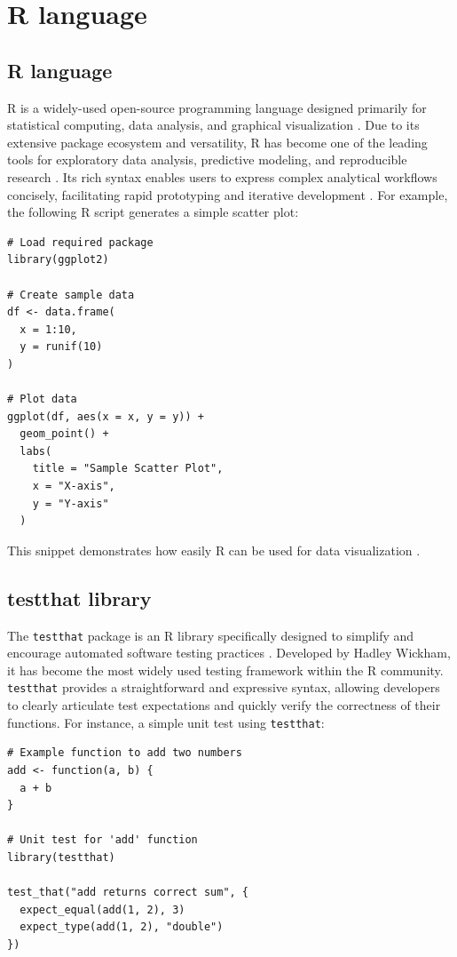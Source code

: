 \section{R language}

\subsection{R language}

R is a widely-used open-source programming language designed primarily for statistical computing, data analysis, and graphical visualization \cite{rcore2024}. Due to its extensive package ecosystem and versatility, R has become one of the leading tools for exploratory data analysis, predictive modeling, and reproducible research \cite{wickham2014advanced}. Its rich syntax enables users to express complex analytical workflows concisely, facilitating rapid prototyping and iterative development \cite{wickham2019r4ds}. For example, the following R script generates a simple scatter plot:

\begin{verbatim}
# Load required package
library(ggplot2)

# Create sample data
df <- data.frame(
  x = 1:10,
  y = runif(10)
)

# Plot data
ggplot(df, aes(x = x, y = y)) +
  geom_point() +
  labs(
    title = "Sample Scatter Plot",
    x = "X-axis",
    y = "Y-axis"
  )
\end{verbatim}

This snippet demonstrates how easily R can be used for data visualization \cite{wickham2019r4ds}.

\subsection{testthat library}

The \texttt{testthat} package is an R library specifically designed to simplify and encourage automated software testing practices \cite{wickham2011testthat}. Developed by Hadley Wickham, it has become the most widely used testing framework within the R community. \texttt{testthat} provides a straightforward and expressive syntax, allowing developers to clearly articulate test expectations and quickly verify the correctness of their functions. For instance, a simple unit test using \texttt{testthat}:

\begin{verbatim}
# Example function to add two numbers
add <- function(a, b) {
  a + b
}

# Unit test for 'add' function
library(testthat)

test_that("add returns correct sum", {
  expect_equal(add(1, 2), 3)
  expect_type(add(1, 2), "double")
})
\end{verbatim}

